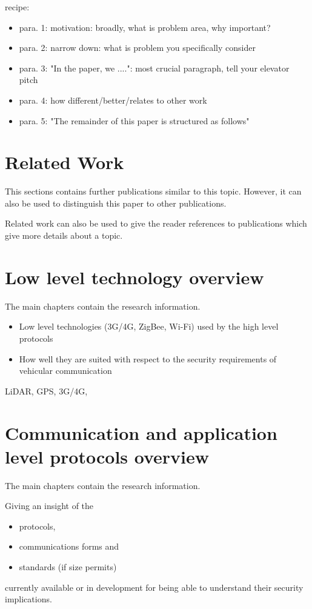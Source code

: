 \documentclass[conference]{IEEEtran}
\begin{document}
recipe:
\begin{itemize}
	\item para. 1: motivation: broadly, what is problem area, why important?
	\item para. 2: narrow down: what is problem you specifically consider
	\item para. 3: "In the paper, we ....": most crucial paragraph, tell your elevator pitch
	\item para. 4: how different/better/relates to other work
	\item para. 5: "The remainder of this paper is structured as follows"
\end{itemize}


\section{Related Work}

This sections contains further publications similar to this topic. However, it can also be used to distinguish this paper to other publications.

Related work can also be used to give the reader references to publications which give more details about a topic.

\section{Low level technology overview}

The main chapters contain the research information.

\begin{itemize}
	\item Low level technologies (3G/4G, ZigBee, Wi-Fi) used by the high level protocols
	\item How well they are suited with respect to the security
		requirements of vehicular communication
\end{itemize}

LiDAR, GPS, 3G/4G, 

\section{Communication and application level protocols overview}

The main chapters contain the research information.

Giving an insight of the 
\begin{itemize}
	\item protocols,
	\item communications forms and
	\item standards (if size permits)
\end{itemize}
currently available or in development for being able to understand
their security implications.
\end{document}
